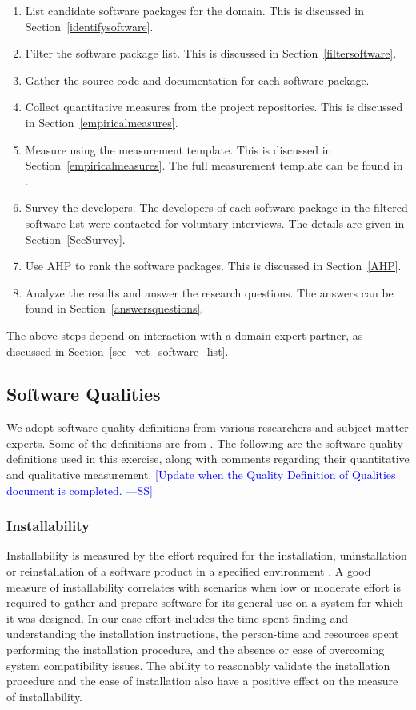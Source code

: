 \documentclass[final, 3p, times, authoryear]{elsarticle}
\newcommand{\authornote}[3]{\textcolor{#1}{[#3 ---#2]}}
\newcommand{\authornote}[3]{}
\newcommand{\wss}[1]{\authornote{blue}{SS}{#1}} %
\begin{document}
\begin{enumerate}
	\item List candidate software packages for the domain. This is discussed in Section~\ref{identifysoftware}.
	\item Filter the software package list. This is discussed in Section~\ref{filtersoftware}.
	\item Gather the source code and documentation for each software package.
	\item Collect quantitative measures from the project repositories. This is discussed in Section~\ref{empiricalmeasures}.
	\item Measure using the measurement template. This is discussed in Section~\ref{empiricalmeasures}. The full measurement template can be found in \citet{SmithEtAl2021}.
	\item Survey the developers. The developers of each software package in the
	filtered software list were contacted for voluntary interviews. The details are given in Section~\ref{SecSurvey}.
	\item Use AHP to rank the software packages. This is discussed in Section~\ref{AHP}.
	\item Analyze the results and answer the research questions. The answers can be found in Section~\ref{answersquestions}.
\end{enumerate}

The above steps depend on interaction with a domain expert partner, as discussed
in Section~\ref{sec_vet_software_list}.

\subsection{Software Qualities} \label{softwarequalities}

We adopt software quality definitions from various researchers and subject
matter experts. Some of the definitions are from \cite{Smithetal2020}. The
following are the software quality definitions used in this exercise, along with
comments regarding their quantitative and qualitative measurement.  \wss{Update
when the Quality Definition of Qualities document is completed.}

\subsubsection{Installability}

Installability is measured by the effort required for the installation,
uninstallation or reinstallation of a software product in a specified
environment \citep{ISO/IEC25010, lenhard2013measuring}. A good measure of
installability correlates with scenarios when low or moderate effort is required
to gather and prepare software for its general use on a system for which it was
designed. In our case effort includes the time spent finding and understanding
the installation instructions, the person-time and resources spent performing
the installation procedure, and the absence or ease of overcoming system
compatibility issues. The ability to reasonably validate the installation
procedure and the ease of installation also have a positive effect on the
measure of installability.
\end{document}
